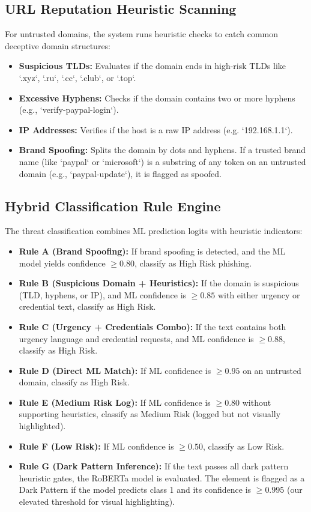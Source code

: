 \documentclass[12pt,a4paper]{report}
\begin{document}
\subsection{URL Reputation Heuristic Scanning}
For untrusted domains, the system runs heuristic checks to catch common deceptive domain structures:
\begin{itemize}
    \item \textbf{Suspicious TLDs:} Evaluates if the domain ends in high-risk TLDs like `.xyz`, `.ru`, `.cc`, `.club`, or `.top`.
    \item \textbf{Excessive Hyphens:} Checks if the domain contains two or more hyphens (e.g., `verify-paypal-login`).
    \item \textbf{IP Addresses:} Verifies if the host is a raw IP address (e.g. `192.168.1.1`).
    \item \textbf{Brand Spoofing:} Splits the domain by dots and hyphens. If a trusted brand name (like `paypal` or `microsoft`) is a substring of any token on an untrusted domain (e.g., `paypal-update`), it is flagged as spoofed.
\end{itemize}

\subsection{Hybrid Classification Rule Engine}
The threat classification combines ML prediction logits with heuristic indicators:
\begin{itemize}
    \item \textbf{Rule A (Brand Spoofing):} If brand spoofing is detected, and the ML model yields confidence $\ge 0.80$, classify as High Risk phishing.
    \item \textbf{Rule B (Suspicious Domain + Heuristics):} If the domain is suspicious (TLD, hyphens, or IP), and ML confidence is $\ge 0.85$ with either urgency or credential text, classify as High Risk.
    \item \textbf{Rule C (Urgency + Credentials Combo):} If the text contains both urgency language and credential requests, and ML confidence is $\ge 0.88$, classify as High Risk.
    \item \textbf{Rule D (Direct ML Match):} If ML confidence is $\ge 0.95$ on an untrusted domain, classify as High Risk.
    \item \textbf{Rule E (Medium Risk Log):} If ML confidence is $\ge 0.80$ without supporting heuristics, classify as Medium Risk (logged but not visually highlighted).
    \item \textbf{Rule F (Low Risk):} If ML confidence is $\ge 0.50$, classify as Low Risk.
    \item \textbf{Rule G (Dark Pattern Inference):} If the text passes all dark pattern heuristic gates, the RoBERTa model is evaluated. The element is flagged as a Dark Pattern if the model predicts class 1 and its confidence is $\ge 0.995$ (our elevated threshold for visual highlighting).
\end{itemize}
\end{document}
